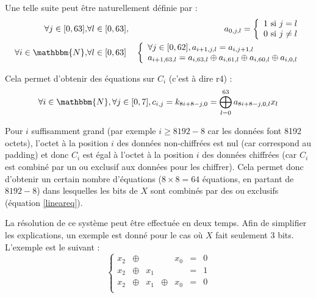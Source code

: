 \documentclass[a4paper,10pt]{article}
\begin{document}
Une telle suite peut être naturellement définie par :
\begin{eqnarray*}
\forall j \in [0, 63], & \forall l \in [0, 63], & a_{0,j,l} = \left\{\begin{array}{l}
    1 \mbox{ si } j = l \\
    0 \mbox{ si } j \neq l
\end{array}\right. \\
\forall i \in \mathbbm{N}, & \forall l \in [0, 63] & \left\{\begin{array}{l}
    \forall j \in [0, 62], a_{i+1,j,l} = a_{i,j+1,l} \\
    a_{i+1,63,l} = a_{i,63,l} \oplus a_{i,61,l} \oplus a_{i,60,l} \oplus a_{i,0,l}
\end{array}\right.
\end{eqnarray*}

Cela permet d'obtenir des équations sur $C_i$ (c'est à dire r4) :
\begin{equation}
\label{lineareq}
\forall i \in \mathbbm{N}, \forall j \in [0, 7], c_{i,j} = k_{8i + 8 - j, 0} = \bigoplus_{l=0}^{63} a_{8i + 8 - j,0,l}x_l
\end{equation}

Pour $i$ suffisamment grand (par exemple $i \ge 8192 - 8$ car les données font 8192 octets), l'octet à la position $i$ des données non-chiffrées est nul (car correspond au padding) et donc $C_i$ est égal à l'octet à la position $i$ des données chiffrées (car $C_i$ est combiné par un ou exclusif aux données pour les chiffrer). Cela permet donc d'obtenir un certain nombre d'équations ($8 \times 8 = 64$ équations, en partant de $8192 - 8$) dans lesquelles les bits de $X$ sont combinés par des ou exclusifs (équation \ref{lineareq}).

La résolution de ce système peut être effectuée en deux temps. Afin de simplifier les explications, un exemple est donné pour le cas où $X$ fait seulement 3 bits. L'exemple est le suivant :
\begin{displaymath}
\left\{\begin{array}{ccccccl}
    x_2 &\oplus&     &      & x_0 &=& 0 \\
    x_2 &\oplus& x_1 &      &     &=& 1 \\
    x_2 &\oplus& x_1 &\oplus& x_0 &=& 0 \\
\end{array}\right.
\end{displaymath}
\end{document}
